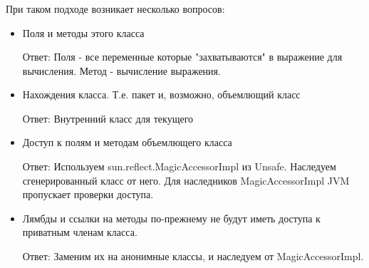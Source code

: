 \begin{frame}
\frametitle{\insertsection} 
\framesubtitle{\insertsubsection}
При таком подходе возникает несколько вопросов:
\begin{itemize}
	\item Поля и методы этого класса
	
	Ответ: Поля - все переменные которые "захватываются" в выражение для вычисления. Метод - вычисление выражения.
	
	\item Нахождения класса. Т.е. пакет и, возможно, объемлющий класс
	
	Ответ: Внутренний класс для текущего
	
	\item Доступ к полям и методам объемлющего класса
	
	Ответ: Используем sun.reflect.MagicAccessorImpl из Unsafe. Наследуем сгенерированный класс от него. Для наследников MagicAccessorImpl JVM пропускает проверки доступа.
	
	\item Лямбды и ссылки на методы по-прежнему не будут иметь доступа к приватным членам класса.
	
	Ответ: Заменим их на анонимные классы, и наследуем от MagicAccessorImpl.
\end{itemize}
\end{frame}
